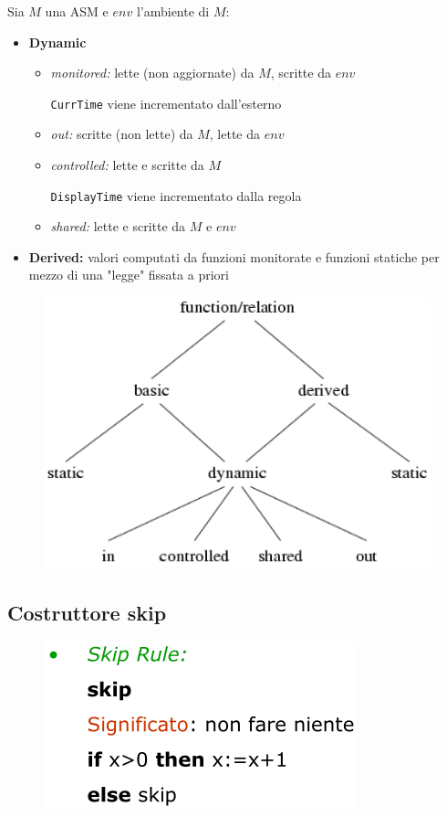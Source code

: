 \noindent Sia $M$ una ASM e $env$ l'ambiente di $M$:
\begin{itemize}
    \item \textbf{Dynamic}
    \begin{itemize}
        \item \textit{monitored:} lette (non aggiornate) da $M$, scritte da $env$
        
        \texttt{CurrTime} viene incrementato dall'esterno
        \item \textit{out:} scritte (non lette) da $M$, lette da $env$
        \item \textit{controlled:} lette e scritte da $M$
        
        \texttt{DisplayTime} viene incrementato dalla regola
        \item \textit{shared:} lette e scritte da $M$ e $env$  
    \end{itemize}
    \item \textbf{Derived:} valori computati da funzioni monitorate e funzioni statiche 
    per mezzo di una "legge" fissata a priori 
\end{itemize}

\begin{figure}[H]
    \centering
    \includegraphics[width=0.7\linewidth]{chapters/1-asm/images/classificazione-funzioni.png}
\end{figure}

\subsection{Costruttore skip}
\begin{figure}[H]
    \includegraphics[width=0.4\linewidth]{chapters/1-asm/images/skip.png}
\end{figure}

